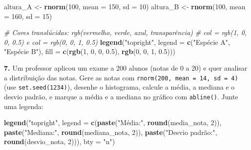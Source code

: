 \documentclass[
  portuguese,
  11pt,
  openany]{book}
\newenvironment{Shaded}{\begin{snugshade}}{\end{snugshade}}
\newcommand{\AttributeTok}[1]{\textcolor[rgb]{0.13,0.29,0.53}{#1}}
\newcommand{\CommentTok}[1]{\textcolor[rgb]{0.56,0.35,0.01}{\textit{#1}}}
\newcommand{\DecValTok}[1]{\textcolor[rgb]{0.00,0.00,0.81}{#1}}
\newcommand{\FloatTok}[1]{\textcolor[rgb]{0.00,0.00,0.81}{#1}}
\newcommand{\FunctionTok}[1]{\textcolor[rgb]{0.13,0.29,0.53}{\textbf{#1}}}
\newcommand{\NormalTok}[1]{#1}
\newcommand{\OtherTok}[1]{\textcolor[rgb]{0.56,0.35,0.01}{#1}}
\newcommand{\StringTok}[1]{\textcolor[rgb]{0.31,0.60,0.02}{#1}}
\begin{document}
\begin{Shaded}
\begin{Highlighting}[]
\NormalTok{altura\_A }\OtherTok{\textless{}{-}} \FunctionTok{rnorm}\NormalTok{(}\DecValTok{100}\NormalTok{, }\AttributeTok{mean =} \DecValTok{150}\NormalTok{, }\AttributeTok{sd =} \DecValTok{10}\NormalTok{)}
\NormalTok{altura\_B }\OtherTok{\textless{}{-}} \FunctionTok{rnorm}\NormalTok{(}\DecValTok{100}\NormalTok{, }\AttributeTok{mean =} \DecValTok{160}\NormalTok{, }\AttributeTok{sd =} \DecValTok{15}\NormalTok{)}

\CommentTok{\# Cores translúcidas: rgb(vermelho, verde, azul, transparência)}
\CommentTok{\# col = rgb(1, 0, 0, 0.5)  e  col = rgb(0, 0, 1, 0.5)}
\FunctionTok{legend}\NormalTok{(}\StringTok{"topright"}\NormalTok{,}
       \AttributeTok{legend =} \FunctionTok{c}\NormalTok{(}\StringTok{"Espécie A"}\NormalTok{, }\StringTok{"Espécie B"}\NormalTok{),}
       \AttributeTok{fill =} \FunctionTok{c}\NormalTok{(}\FunctionTok{rgb}\NormalTok{(}\DecValTok{1}\NormalTok{, }\DecValTok{0}\NormalTok{, }\DecValTok{0}\NormalTok{, }\FloatTok{0.5}\NormalTok{), }\FunctionTok{rgb}\NormalTok{(}\DecValTok{0}\NormalTok{, }\DecValTok{0}\NormalTok{, }\DecValTok{1}\NormalTok{, }\FloatTok{0.5}\NormalTok{)))}
\end{Highlighting}
\end{Shaded}

\textbf{7.} Um professor aplicou um exame a 200 alunos (notas de 0 a 20) e quer analisar a
distribuição das notas. Gere as notas com \texttt{rnorm(200,\ mean\ =\ 14,\ sd\ =\ 4)} (use
\texttt{set.seed(1234)}), desenhe o histograma, calcule a média, a mediana e o desvio padrão,
e marque a média e a mediana no gráfico com \texttt{abline()}. Junte uma legenda:

\begin{Shaded}
\begin{Highlighting}[]
\FunctionTok{legend}\NormalTok{(}\StringTok{"topright"}\NormalTok{,}
       \AttributeTok{legend =} \FunctionTok{c}\NormalTok{(}\FunctionTok{paste}\NormalTok{(}\StringTok{"Média:"}\NormalTok{, }\FunctionTok{round}\NormalTok{(media\_nota, }\DecValTok{2}\NormalTok{)),}
                  \FunctionTok{paste}\NormalTok{(}\StringTok{"Mediana:"}\NormalTok{, }\FunctionTok{round}\NormalTok{(mediana\_nota, }\DecValTok{2}\NormalTok{)),}
                  \FunctionTok{paste}\NormalTok{(}\StringTok{"Desvio padrão:"}\NormalTok{, }\FunctionTok{round}\NormalTok{(desvio\_nota, }\DecValTok{2}\NormalTok{))),}
       \AttributeTok{bty =} \StringTok{"n"}\NormalTok{)}
\end{Highlighting}
\end{Shaded}
\end{document}
